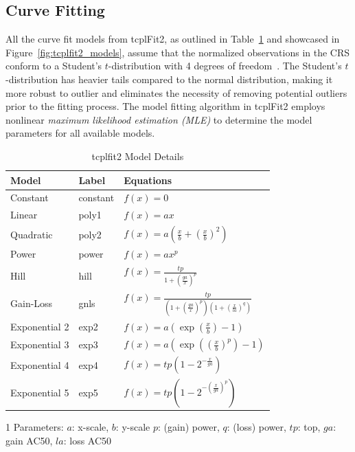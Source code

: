 \subsection{Curve Fitting}
All the curve fit models from tcplFit2, as outlined in Table~\ref{tab:tcplfit2_models} and showcased in Figure~\ref{fig:tcplfit2_models}, assume that the normalized observations in the CRS conform to a Student's $t$-distribution with 4 degrees of freedom~\cite{tcplv3.0}. The Student's $t$-distribution has heavier tails compared to the normal distribution, making it more robust to outlier and eliminates the necessity of removing potential outliers prior to the fitting process. The model fitting algorithm in tcplFit2 employs nonlinear \emph{maximum likelihood estimation (MLE)} to determine the model parameters for all available models.
\begin{table}
    \centering
    \begin{threeparttable}[b]
    \caption{tcplfit2 Model Details}
    \renewcommand{\arraystretch}{1.1}
    \begin{tabular}{lll}
    \toprule
    \textbf{Model} & \textbf{Label} & \textbf{Equations\tnote{1}} \\
    \midrule
    Constant & constant & \(f(x) = 0\) \\ 
    Linear & poly1 & \(f(x) = ax\) \\ 
    Quadratic & poly2 & \(f(x) = a\left(\frac{x}{b} + {\left(\frac{x}{b}\right)}^{2}\right)\) \\ 
    Power & power & \(f(x) = ax^p\) \\ 
    Hill & hill & \(f(x) = \frac{tp}{1 + {\left(\frac{ga}{x}\right)}^{p}}\) \\ 
    Gain-Loss & gnls & \(f(x) = \frac{tp}{(1 + {\left(\frac{ga}{x}\right)}^{p})(1 + {\left(\frac{x}{la}\right)}^{q})}\) \\ 
    Exponential 2 & exp2 & \(f(x) = a\left(\exp\left(\frac{x}{b}\right) - 1\right)\) \\
    Exponential 3 & exp3 & \(f(x) = a\left(\exp\left({\left(\frac{x}{b}\right)}^{p}\right) - 1\right)\) \\
    Exponential 4 & exp4 & \(f(x) = tp\left(1 - 2^{-\frac{x}{ga}}\right)\) \\
    Exponential 5 & exp5 & \(f(x) = tp{\left(1 - 2^{-(\frac{x}{ga})^{p}}\right)}\) \\
    \bottomrule
    \end{tabular}
    \begin{tablenotes}
        \item [1] Parameters: $a$: x-scale, $b$: y-scale $p$: (gain) power, $q$: (loss) power, $tp$: top, $ga$: gain AC50, $la$: loss AC50
    \end{tablenotes}
~\label{tab:tcplfit2_models}
\end{threeparttable}
\end{table}

